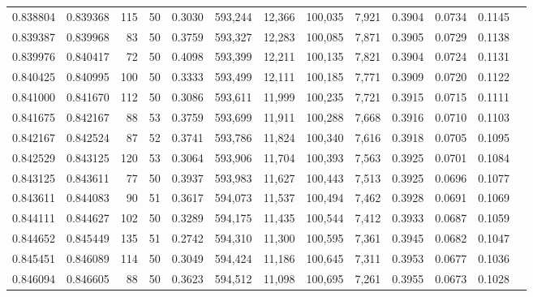 \begin{tabular}{rrrrrrrrrrrrr}
0.838804 & 0.839368 &   115 &  50 &                                     0.3030 & 593,244 &  12,366 & 100,035 &   7,921 & 0.3904 & 0.0734 & 0.1145 \\
0.839387 & 0.839968 &    83 &  50 &                                     0.3759 & 593,327 &  12,283 & 100,085 &   7,871 & 0.3905 & 0.0729 & 0.1138 \\
0.839976 & 0.840417 &    72 &  50 &                                     0.4098 & 593,399 &  12,211 & 100,135 &   7,821 & 0.3904 & 0.0724 & 0.1131 \\
0.840425 & 0.840995 &   100 &  50 &                                     0.3333 & 593,499 &  12,111 & 100,185 &   7,771 & 0.3909 & 0.0720 & 0.1122 \\
0.841000 & 0.841670 &   112 &  50 &                                     0.3086 & 593,611 &  11,999 & 100,235 &   7,721 & 0.3915 & 0.0715 & 0.1111 \\
0.841675 & 0.842167 &    88 &  53 &                                     0.3759 & 593,699 &  11,911 & 100,288 &   7,668 & 0.3916 & 0.0710 & 0.1103 \\
0.842167 & 0.842524 &    87 &  52 &                                     0.3741 & 593,786 &  11,824 & 100,340 &   7,616 & 0.3918 & 0.0705 & 0.1095 \\
0.842529 & 0.843125 &   120 &  53 &                                     0.3064 & 593,906 &  11,704 & 100,393 &   7,563 & 0.3925 & 0.0701 & 0.1084 \\
0.843125 & 0.843611 &    77 &  50 &                                     0.3937 & 593,983 &  11,627 & 100,443 &   7,513 & 0.3925 & 0.0696 & 0.1077 \\
0.843611 & 0.844083 &    90 &  51 &                                     0.3617 & 594,073 &  11,537 & 100,494 &   7,462 & 0.3928 & 0.0691 & 0.1069 \\
0.844111 & 0.844627 &   102 &  50 &                                     0.3289 & 594,175 &  11,435 & 100,544 &   7,412 & 0.3933 & 0.0687 & 0.1059 \\
0.844652 & 0.845449 &   135 &  51 &                                     0.2742 & 594,310 &  11,300 & 100,595 &   7,361 & 0.3945 & 0.0682 & 0.1047 \\
0.845451 & 0.846089 &   114 &  50 &                                     0.3049 & 594,424 &  11,186 & 100,645 &   7,311 & 0.3953 & 0.0677 & 0.1036 \\
0.846094 & 0.846605 &    88 &  50 &                                     0.3623 & 594,512 &  11,098 & 100,695 &   7,261 & 0.3955 & 0.0673 & 0.1028 \\

\end{tabular}
